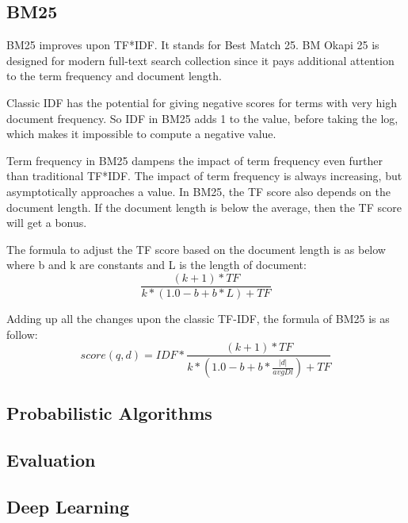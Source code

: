 \subsection{BM25} %
\label{sub:bm25}

BM25 improves upon TF*IDF. It stands for Best Match 25. BM Okapi 25 is designed for modern full-text search collection since it pays additional attention to the term frequency and document length.

Classic IDF has the potential for giving negative scores for terms with very high document frequency. So IDF in BM25 adds 1 to the value, before taking the log, which makes it impossible to compute a negative value.

Term frequency in BM25 dampens the impact of term frequency even further than traditional TF*IDF. The impact of term frequency is always increasing, but asymptotically approaches a value. In BM25, the TF score also depends on the document length. If the document length is below the average, then the TF score will get a bonus. 

The formula to adjust the TF score based on the document length is as below where b and k are constants and L is the length of document:
\[\frac{(k + 1) * TF}{k * (1.0 - b + b * L) + TF}\]

Adding up all the changes upon the classic TF-IDF, the formula of BM25 is as follow:
\[score(q,d)=IDF * \frac{(k + 1) * TF}{k * (1.0 - b + b * \frac{|d|}{avgDl}) + TF}
\]


\subsection{Probabilistic Algorithms} %
\label{sub:probabilistic_algorithms}


\subsection{Evaluation} %
\label{sub:evaluation}


\subsection{Deep Learning} %
\label{sub:deep_learning}


